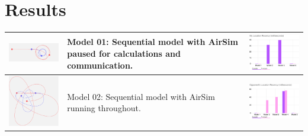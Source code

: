 \documentclass{article}
\begin{document}
\section{Results}
\begin{table}[t]
	\centering
	\begin{tabular}{p{6.5cm}p{4cm}p{6.5cm} }

		\includegraphics[width=6cm]{model01-no-sleep}&Model 01: Sequential model with AirSim paused for calculations and communication.& \includegraphics[width=6cm]{my_location}\\\hline 
		\includegraphics[width=6cm]{model02}&Model 02: Sequential model with AirSim running throughout.&\includegraphics[width=6cm]{opp_location}\\			
		\hline

\end{tabular}
\end{table}
\end{document}
